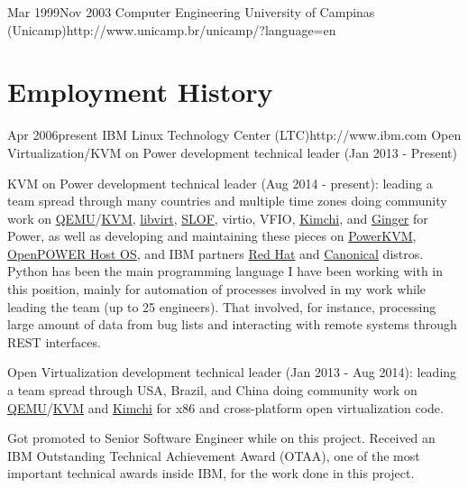 \documentclass[10pt]{article} %
\begin{document}

\education
{Mar 1999}{Nov 2003}
{Computer Engineering}
{University of Campinas (Unicamp)}{http://www.unicamp.br/unicamp/?language=en}



\section{Employment History}

\employer
{Apr 2006}{present}
{IBM Linux Technology Center (LTC)}{http://www.ibm.com}
\job
{Open Virtualization/KVM on Power development technical leader (Jan 2013 - Present)}
{

\begin{itemize-noindent}
\item{KVM on Power development technical leader (Aug 2014 - present): leading a team spread through many countries and multiple time zones doing community work on \href{http://www.qemu.org/}{QEMU}/\href{http://www.linux-kvm.org}{KVM}, \href{https://libvirt.org/}{libvirt}, \href{https://github.com/aik/SLOF}{SLOF}, virtio, VFIO, \href{https://github.com/kimchi-project/kimchi}{Kimchi}, and \href{https://github.com/kimchi-project/ginger}{Ginger} for Power, as well as developing and maintaining these pieces on \href{http://www-03.ibm.com/systems/power/software/linux/powerkvm/}{PowerKVM}, \href{https://open-power-host-os.github.io/}{OpenPOWER Host OS}, and IBM partners \href{https://www.redhat.com/en}{Red Hat} and \href{https://canonical.com/}{Canonical} distros. Python has been the main programming language I have been working with in this position, mainly for automation of processes involved in my work while leading the team (up to 25 engineers). That involved, for instance, processing large amount of data from bug lists and interacting with remote systems through REST interfaces.}
\item{Open Virtualization development technical leader (Jan 2013 - Aug 2014): leading a team spread through USA, Brazil, and China doing community work on \href{http://www.qemu.org/}{QEMU}/\href{http://www.linux-kvm.org}{KVM} and \href{https://github.com/kimchi-project/kimchi}{Kimchi} for x86 and cross-platform open virtualization code.}
\item{Got promoted to Senior Software Engineer while on this project. Received an IBM Outstanding Technical Achievement Award (OTAA), one of the most important technical awards inside IBM, for the work done in this project.}
\end{itemize-noindent}

}
\end{document}
